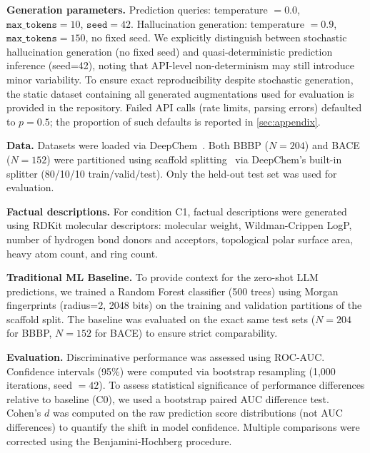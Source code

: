 \textbf{Generation parameters.} Prediction queries: temperature $= 0.0$, $\texttt{max\_tokens} = 10$, $\texttt{seed} = 42$. Hallucination generation: temperature $= 0.9$, $\texttt{max\_tokens} = 150$, no fixed seed. We explicitly distinguish between stochastic hallucination generation (no fixed seed) and quasi-deterministic prediction inference (seed=42), noting that API-level non-determinism may still introduce minor variability. To ensure exact reproducibility despite stochastic generation, the static dataset containing all generated augmentations used for evaluation is provided in the repository. Failed API calls (rate limits, parsing errors) defaulted to $p = 0.5$; the proportion of such defaults is reported in \ref{sec:appendix}.

\textbf{Data.} Datasets were loaded via DeepChem~\cite{ramsundar2019deepchem}. Both BBBP ($N=204$) and BACE ($N=152$) were partitioned using scaffold splitting~\cite{bemis1996properties} via DeepChem's built-in splitter (80/10/10 train/valid/test). Only the held-out test set was used for evaluation.

\textbf{Factual descriptions.} For condition C1, factual descriptions were generated using RDKit molecular descriptors: molecular weight, Wildman-Crippen LogP, number of hydrogen bond donors and acceptors, topological polar surface area, heavy atom count, and ring count.

\textbf{Traditional ML Baseline.} To provide context for the zero-shot LLM predictions, we trained a Random Forest classifier (500 trees) using Morgan fingerprints (radius=2, 2048 bits) on the training and validation partitions of the scaffold split. The baseline was evaluated on the exact same test sets ($N=204$ for BBBP, $N=152$ for BACE) to ensure strict comparability.

\textbf{Evaluation.} Discriminative performance was assessed using ROC-AUC. Confidence intervals (95\%) were computed via bootstrap resampling (1,000 iterations, seed $= 42$). To assess statistical significance of performance differences relative to baseline (C0), we used a bootstrap paired AUC difference test. Cohen's $d$ was computed on the raw prediction score distributions (not AUC differences) to quantify the shift in model confidence. Multiple comparisons were corrected using the Benjamini-Hochberg procedure.

